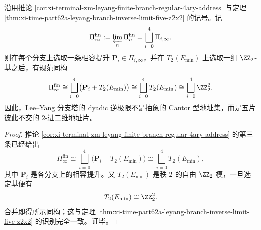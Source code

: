 \begin{conclusion}\label{con:xi-time-part62b-leyang-branch-inverse-limit-five-z2x2}
沿用推论 \ref{cor:xi-terminal-zm-leyang-finite-branch-regular-4ary-address} 与定理 \ref{thm:xi-time-part62a-leyang-branch-inverse-limit-five-z2x2} 的记号。记
\[
\Pi_\infty^{\mathrm{fin}}
:=
\varprojlim_n \Pi_n^{\mathrm{fin}}
=
\bigsqcup_{i=0}^{4}\Pi_{i,\infty}.
\]
则在每个分支上选取一条相容提升 \(\mathbf P_i\in\Pi_{i,\infty}\)，并在 \(T_2(E_{\min})\) 上选取一组 \(\ZZ_2\)-基之后，有规范同构
\[
\Pi_\infty^{\mathrm{fin}}
\cong
\bigsqcup_{i=0}^{4}\bigl(\mathbf P_i+T_2(E_{\min})\bigr)
\cong
\bigsqcup_{i=0}^{4}T_2(E_{\min})
\cong
\bigsqcup_{i=0}^{4}\ZZ_2^2.
\]
因此，Lee--Yang 分支塔的 dyadic 逆极限不是抽象的 Cantor 型地址集，而是五片彼此不交的 \(2\)-进二维地址片。
\end{conclusion}
\begin{proof}
推论 \ref{cor:xi-terminal-zm-leyang-finite-branch-regular-4ary-address} 的第三条已经给出
\[
\Pi_\infty^{\mathrm{fin}}
\cong
\bigsqcup_{i=0}^{4}\bigl(\mathbf P_i+T_2(E_{\min})\bigr)
\cong
\bigsqcup_{i=0}^{4}T_2(E_{\min}),
\]
其中 \(\mathbf P_i\) 是各分支上的相容提升。又 \(T_2(E_{\min})\) 是秩 \(2\) 的自由 \(\ZZ_2\)-模，一旦选定基便有
\[
T_2(E_{\min})\cong \ZZ_2^2.
\]
合并即得所示同构；这与定理 \ref{thm:xi-time-part62a-leyang-branch-inverse-limit-five-z2x2} 的识别完全一致。证毕。
\end{proof}

